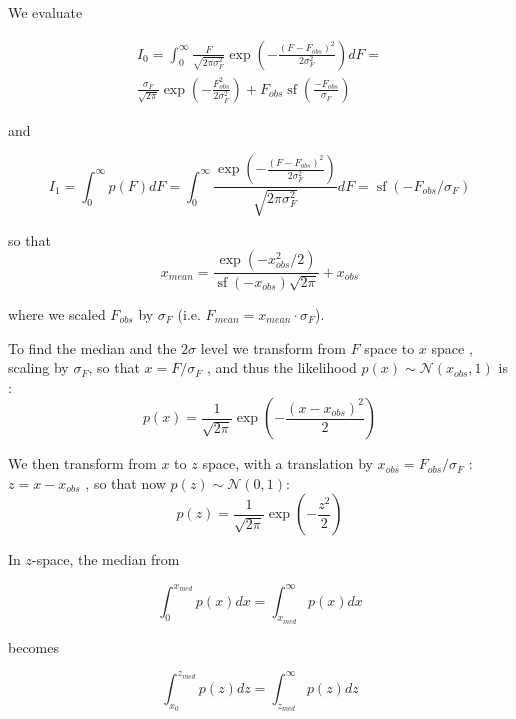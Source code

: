 \documentclass[fleqn,usenatbib]{mnras}  %
\DeclareMathOperator\sf{sf}
\begin{document}
We evaluate 

\begin{multline}
I_{0}= \int _{0} ^ {\infty} {\frac{F}{\sqrt{2\pi\sigma_{F}^{2}}} \exp{\left(-\frac{(F-F_{obs})^{2}}{2\sigma_{F}^{2}}\right)} }dF = \\  \frac{\sigma_{F}}{\sqrt{2 \pi}} \exp{\left(- \frac{F_{obs}^{2}}{2\sigma_{F}^{2}} \right)} + F_{obs} \sf{\left( \frac{-F_{obs}}{\sigma_{F}}\right)}
\end{multline}

and 

\begin{equation}
I_{1} = \int _{0} ^ {\infty}{ p(F) dF} = \int _{0} ^ {\infty} {\frac{\exp{\left(-\frac{(F-F_{obs})^{2}}{2\sigma_{F}^{2}}\right)} }{\sqrt{2\pi\sigma_{F}^{2}}} }dF = \sf{(-F_{obs} / \sigma_{F})}
\end{equation}

so that 
\begin{equation}
x_{mean} = \frac{\exp{(- x_{obs}^{2} / 2 )} }{\sf{(-x_{obs})}\sqrt{2 \pi}} + x_{obs} 
\end{equation}

where we scaled $F_{obs}$ by  $\sigma_F$  (i.e. $F_{mean} = x_{mean} \cdot \sigma_{F}$). 



\bigskip

To find the median and the $2\sigma$ level we transform from $F$ space to $x$ space , scaling by  $\sigma_{F}$, so that $x = F / \sigma_{F}$ , and thus the likelihood $p(x) \sim \mathcal{N}(x_{obs},1)$ is :
\begin{equation}
p(x) = \frac{1}{\sqrt{2  \pi }} \exp{ \left(-\frac{(x-x_{obs})^{2}}{2}\right)}
\end{equation}

We  then transform from $x$ to $z$ space, with  a translation by $x_{obs} = F_{obs} / \sigma_{F}$ :  $z = x - x_{obs}$  , so that now  $p(z) \sim \mathcal{N}(0,1)$:
\begin{equation}
p(z) = \frac{1}{\sqrt{2  \pi }} \exp{ \left(-\frac{z^2}{2}\right)}
\end{equation}



In $z$-space, the median from 

\begin{equation}
\int_{0}^{x_{med}} {p(x)dx} = \int_{x_{med}}^{\infty} {p(x)dx}
\end{equation}
 
becomes 

\begin{equation}
\int_{x_{0}}^{z_{med}}{p(z)dz} = \int_{z_{med}}^{\infty}{p(z)dz}
\end{equation}
\end{document}
